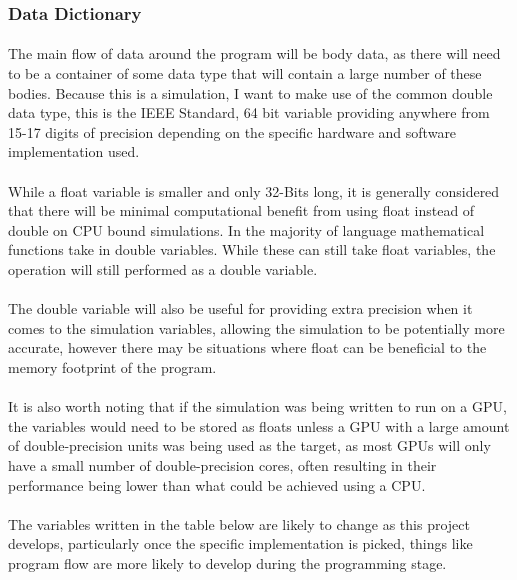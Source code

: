 \pagebreak

\subsubsection{Data Dictionary}
\paragraph{}
The main flow of data around the program will be body data, as there will need to be a container of some data type that will contain a large number of these bodies. Because this is a simulation, I want to make use of the common double data type, this is the IEEE Standard, 64 bit variable providing anywhere from 15-17 digits of precision depending on the specific hardware and software implementation used.

\paragraph{} 
While a float variable is smaller and only 32-Bits long, it is generally considered that there will be minimal computational benefit from using float instead of double on CPU bound simulations. In the majority of language mathematical functions take in double variables. While these can still take float variables, the operation will still performed as a double variable.

\paragraph{}
The double variable will also be useful for providing extra precision when it comes to the simulation variables, allowing the simulation to be potentially more accurate, however there may be situations where float can be beneficial to the memory footprint of the program.

\paragraph{}
It is also worth noting that if the simulation was being written to run on a GPU, the variables would need to be stored as floats unless a GPU with a large amount of double-precision units was being used as the target, as most GPUs will only have a small number of double-precision cores, often resulting in their performance being lower than what could be achieved using a CPU.

\paragraph{}
The variables written in the table below are likely to change as this project develops, particularly once the specific implementation is picked, things like program flow are more likely to develop during the programming stage.

